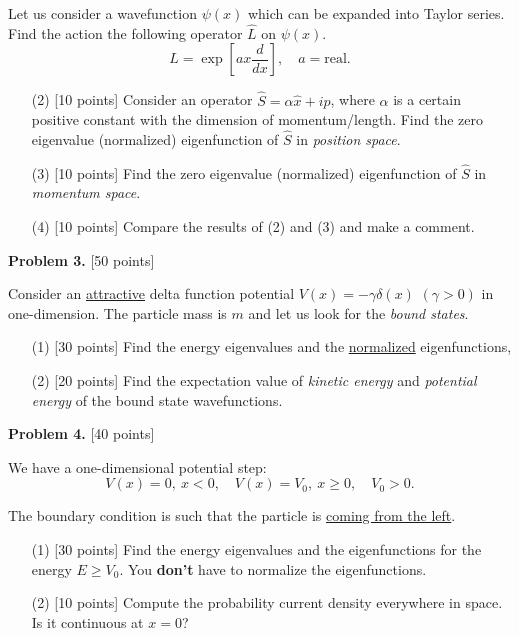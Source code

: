 \documentclass[11pt]{article}
\begin{document}
\noindent
Let us consider a wavefunction $\psi(x)$ which can be expanded into Taylor series. Find the action the following operator $\hat{L}$ on $\psi (x)$.
\begin{equation*}
    \hat{L} = \exp{\left[ ax \frac{d}{dx} \right]}, \quad a = \text{real.}
\end{equation*}

\begin{enumerate}[leftmargin=3.5em,itemsep=-3pt]
    \item[(2)] [10 points] Consider an operator $\hat{S} = \alpha \hat{x} + i \hat{p}$, where $\alpha$ is a certain positive constant with the dimension of momentum/length. Find the zero eigenvalue (normalized) eigenfunction of $\hat{S}$ in \textit{position space}.
    \item[(3)] [10 points] Find the zero eigenvalue (normalized) eigenfunction of $\hat{S}$ in \textit{momentum space}.
    \item[(4)] [10 points] Compare the results of (2) and (3) and make a comment.
\end{enumerate}

\textbf{Problem 3.} [50 points]

Consider an \underline{attractive} delta function potential $V(x) = -\gamma \delta(x)$ $(\gamma > 0 )$ in one-dimension. The particle mass is $m$ and let us look for the \textit{bound states}.
\vspace{-4mm}

\begin{enumerate}[leftmargin=3.5em,itemsep=-3pt]
    \item[(1)] [30 points] Find the energy eigenvalues and the \underline{normalized} eigenfunctions,
    \item[(2)] [20 points] Find the expectation value of \textit{kinetic energy} and \textit{potential energy} of the bound state wavefunctions.
\end{enumerate}

\newpage

\thispagestyle{empty}
\textbf{Problem 4.} [40 points]

We have a one-dimensional potential step:
\begin{equation*}
    V(x) = 0, \ x<0, \quad V(x) = V_0, \ x \geq 0, \quad V_0 >0.
\end{equation*}

The boundary condition is such that the particle is \underline{coming from the left}.

\vspace{-4mm}
\begin{enumerate}[leftmargin=3.5em,itemsep=-3pt]
    \item[(1)] [30 points] Find the energy eigenvalues and the eigenfunctions for the energy $E \geq V_0$. You \textbf{don't} have to normalize the eigenfunctions.
    \item[(2)] [10 points] Compute the probability current density everywhere in space. Is it continuous at $x=0$?
\end{enumerate}
\end{document}
